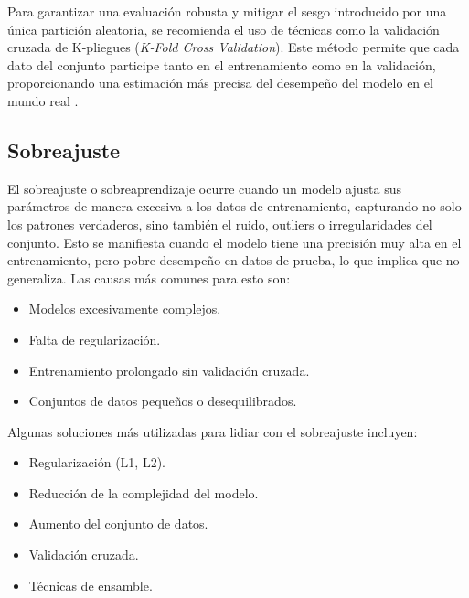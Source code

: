 \documentclass[12pt]{article}
\begin{document}
\cite{De0a100enIA}

Para garantizar una evaluación robusta y mitigar el sesgo introducido por una única partición aleatoria, se recomienda el uso de técnicas como la validación cruzada de K-pliegues (\textit{K-Fold Cross Validation}). Este método permite que cada dato del conjunto participe tanto en el entrenamiento como en la validación, proporcionando una estimación más precisa del desempeño del modelo en el mundo real \cite{raschka2015python}.

\subsection{Sobreajuste}
    El sobreajuste o sobreaprendizaje ocurre cuando un modelo ajusta sus parámetros de manera excesiva a los datos de entrenamiento, capturando no solo los patrones verdaderos, sino también el ruido, outliers o irregularidades del conjunto. Esto se manifiesta cuando el modelo tiene una precisión muy alta en el entrenamiento, pero pobre desempeño en datos de prueba, lo que implica que no generaliza. Las causas más comunes para esto son:
    \begin{itemize}
        \item Modelos excesivamente complejos.
        \item Falta de regularización.
        \item Entrenamiento prolongado sin validación cruzada.
        \item Conjuntos de datos pequeños o desequilibrados.
    \end{itemize}

    Algunas soluciones más utilizadas para lidiar con el sobreajuste incluyen:
    \begin{itemize}
        \item Regularización (L1, L2).
        \item Reducción de la complejidad del modelo.
        \item Aumento del conjunto de datos.
        \item Validación cruzada.
        \item Técnicas de ensamble.
    \end{itemize}
\cite{De0a100enIA}
\end{document}
